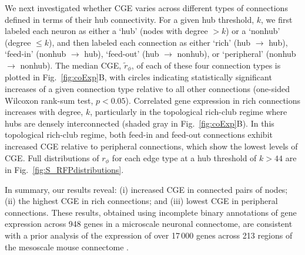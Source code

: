 \documentclass[10pt,letterpaper]{article}
\begin{document}
We next investigated whether CGE varies across different types of connections defined in terms of their hub connectivity.
For a given hub threshold, $k$, we first labeled each neuron as either a `hub' (nodes with degree $> k$) or a `nonhub' (degree $\leq k$), and then labeled each connection as either `rich' (hub $\rightarrow$ hub), `feed-in' (nonhub $\rightarrow$ hub), `feed-out' (hub $\rightarrow$ nonhub), or `peripheral' (nonhub $\rightarrow$ nonhub).
The median CGE, $\tilde{r}_\phi$, of each of these four connection types is plotted in Fig.~\ref{fig:coExp}B, with circles indicating statistically significant increases of a given connection type relative to all other connections (one-sided Wilcoxon rank-sum test, $p < 0.05$).
Correlated gene expression in rich connections increases with degree, $k$, particularly in the topological rich-club regime where hubs are densely interconnected (shaded gray in Fig.~\ref{fig:coExp}B).
In this topological rich-club regime, both feed-in and feed-out connections exhibit increased CGE relative to peripheral connections, which show the lowest levels of CGE.
Full distributions of $r_\phi$ for each edge type at a hub threshold of $k > 44$ are in Fig.~\ref{fig:S_RFPdistributions}.

In summary, our results reveal:
(i) increased CGE in connected pairs of nodes;
(ii) the highest CGE in rich connections; and
(iii) lowest CGE in peripheral connections.
These results, obtained using incomplete binary annotations of gene expression across 948 genes in a microscale neuronal connectome, are consistent with a prior analysis of the expression of over 17\,000 genes across 213 regions of the mesoscale mouse connectome \cite{Fulcher:2016ck}.
\end{document}
